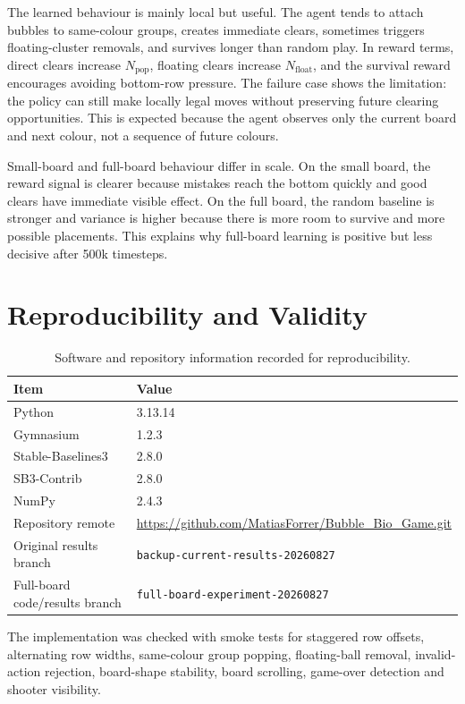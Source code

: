 \documentclass[10pt,a4paper]{article}
\begin{document}
The learned behaviour is mainly local but useful. The agent tends to attach bubbles to same-colour groups, creates immediate clears, sometimes triggers floating-cluster removals, and survives longer than random play. In reward terms, direct clears increase \(N_{\mathrm{pop}}\), floating clears increase \(N_{\mathrm{float}}\), and the survival reward encourages avoiding bottom-row pressure. The failure case shows the limitation: the policy can still make locally legal moves without preserving future clearing opportunities. This is expected because the agent observes only the current board and next colour, not a sequence of future colours.

Small-board and full-board behaviour differ in scale. On the small board, the reward signal is clearer because mistakes reach the bottom quickly and good clears have immediate visible effect. On the full board, the random baseline is stronger and variance is higher because there is more room to survive and more possible placements. This explains why full-board learning is positive but less decisive after 500k timesteps.

\section{Reproducibility and Validity}

\begin{table}[H]
\centering
\caption{Software and repository information recorded for reproducibility.}
\label{tab:software}
\small
\begin{tabular}{ll}
\toprule
Item & Value \\
\midrule
Python & 3.13.14 \\
Gymnasium & 1.2.3 \\
Stable-Baselines3 & 2.8.0 \\
SB3-Contrib & 2.8.0 \\
NumPy & 2.4.3 \\
Repository remote & \url{https://github.com/MatiasForrer/Bubble_Bio_Game.git} \\

Original results branch & \texttt{backup-current-results-20260827} \\
Full-board code/results branch & \texttt{full-board-experiment-20260827} \\
\bottomrule
\end{tabular}
\end{table}

The implementation was checked with smoke tests for staggered row offsets, alternating row widths, same-colour group popping, floating-ball removal, invalid-action rejection, board-shape stability, board scrolling, game-over detection and shooter visibility.
\end{document}

